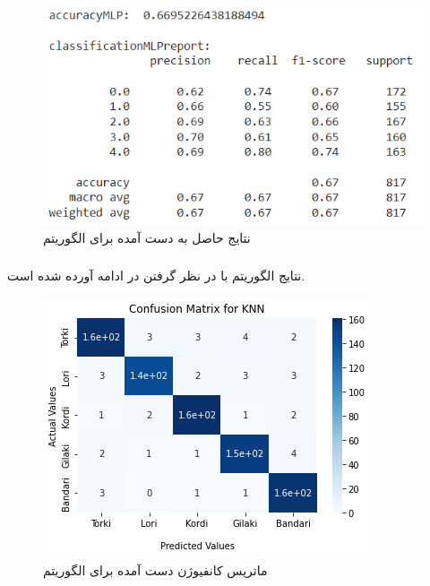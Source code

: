 \begin{figure}[h!]
	\centering
	\includegraphics[width=1\linewidth]{images/mlp_classification_results_augment.PNG}
	\caption{نتایج حاصل به دست آمده برای الگوریتم }
	\label{fig:mlp_classification_results_augment}
\end{figure}

\subsubsection{}
نتایج الگوریتم  با در نظر گرفتن  در ادامه آورده شده است.

\begin{figure}[h!]
	\centering
	\includegraphics[width=1\linewidth]{images/knn_cm_augment.png}
	\caption{ماتریس کانفیوژن دست آمده برای الگوریتم }
	\label{fig:knn_cm_augment}
\end{figure}

